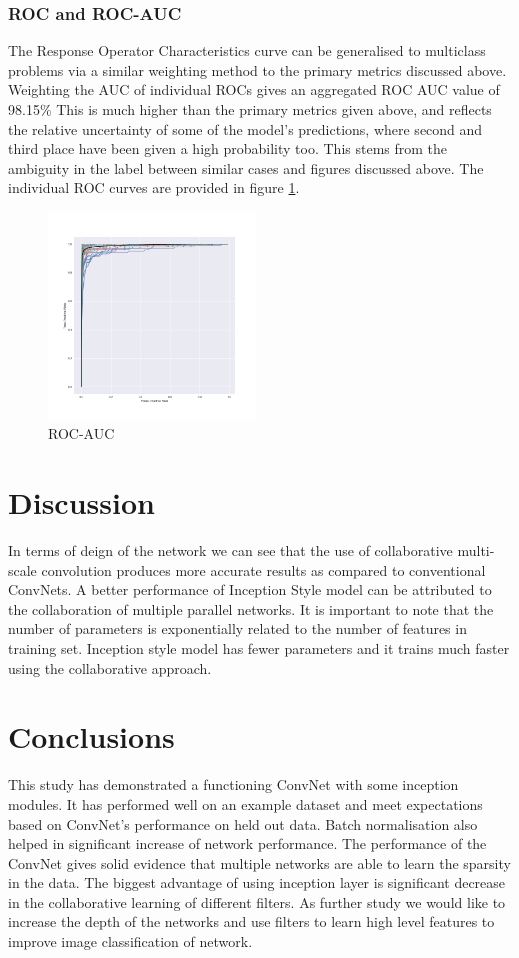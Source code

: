 \documentclass[fleqn,10pt]{SelfArx} %
\begin{document}
\subsubsection{ROC and ROC-AUC}
The Response Operator Characteristics curve can be generalised to multiclass problems via a similar weighting method to the primary metrics discussed above. Weighting the AUC of individual ROCs gives an aggregated ROC AUC value of 98.15\% This is much higher than the primary metrics given above, and reflects the relative uncertainty of some of the model's predictions, where second and third place have been given a high probability too. This stems from the ambiguity in the label between similar cases and figures discussed above. The individual ROC curves are provided in figure \ref{fig:roc}.
\begin{figure}[ht]\centering
\includegraphics[width=0.49\textwidth]{roc_curves}
\caption{ROC-AUC}
\label{fig:roc}
\end{figure}


\section{Discussion}
In terms of deign of the network we can see that the use of collaborative multi-scale convolution produces more accurate results as compared to conventional ConvNets. A better performance of Inception Style model can be attributed to the collaboration of multiple parallel networks. It is important to note that the number of parameters is exponentially related to the number of features in training set. Inception style model has fewer parameters and it trains much faster using the collaborative approach.


\section{Conclusions}
This study has demonstrated a functioning ConvNet with some inception modules. It has performed well on an example dataset and meet expectations based on ConvNet's performance on held out data. Batch normalisation also helped in significant increase of network performance.  
\newline
The performance of the ConvNet gives solid evidence that multiple networks are able to learn the sparsity in the data. The biggest advantage of using inception layer is significant decrease in the collaborative learning of different filters. As further study we would like to increase the depth of the networks and use filters to learn high level features to improve image classification of network.
\end{document}
